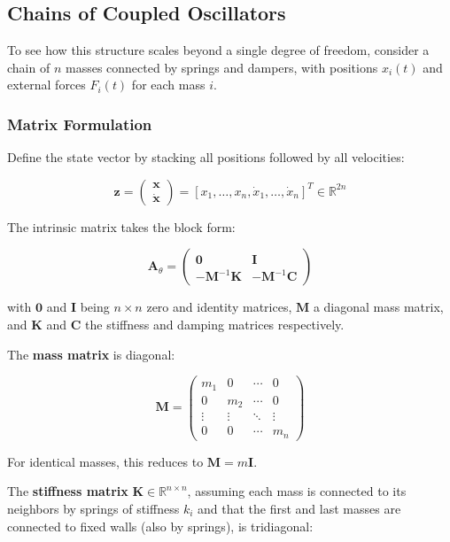 \documentclass[
  letterpaper,
  DIV=11,
  numbers=noendperiod]{scrartcl}
\begin{document}
\subsection{Chains of Coupled
Oscillators}\label{chains-of-coupled-oscillators}

To see how this structure scales beyond a single degree of freedom,
consider a chain of \(n\) masses connected by springs and dampers, with
positions \(x_i(t)\) and external forces \(F_i(t)\) for each mass \(i\).

\subsubsection{Matrix Formulation}\label{matrix-formulation}

Define the state vector by stacking all positions followed by all
velocities:

\[\mathbf{z} = \begin{pmatrix} \mathbf{x} \\ \dot{\mathbf{x}} \end{pmatrix} = [x_1, \ldots, x_n, \dot{x}_1, \ldots, \dot{x}_n]^T \in \mathbb{R}^{2n}\]

The intrinsic matrix takes the block form:

\[\mathbf{A}_\theta = \begin{pmatrix} \mathbf{0} & \mathbf{I} \\ -\mathbf{M}^{-1}\mathbf{K} & -\mathbf{M}^{-1}\mathbf{C} \end{pmatrix}\]

with \(\mathbf{0}\) and \(\mathbf{I}\) being \(n \times n\) zero and
identity matrices, \(\mathbf{M}\) a diagonal mass matrix, and
\(\mathbf{K}\) and \(\mathbf{C}\) the stiffness and damping matrices
respectively.

The \textbf{mass matrix} is diagonal:

\[\mathbf{M} = \begin{pmatrix} m_1 & 0 & \cdots & 0 \\ 0 & m_2 & \cdots & 0 \\ \vdots & \vdots & \ddots & \vdots \\ 0 & 0 & \cdots & m_n \end{pmatrix}\]

For identical masses, this reduces to \(\mathbf{M} = m\mathbf{I}\).

The \textbf{stiffness matrix}
\(\mathbf{K} \in \mathbb{R}^{n \times n}\), assuming each mass is
connected to its neighbors by springs of stiffness \(k_i\) and that the
first and last masses are connected to fixed walls (also by springs), is
tridiagonal:
\end{document}
